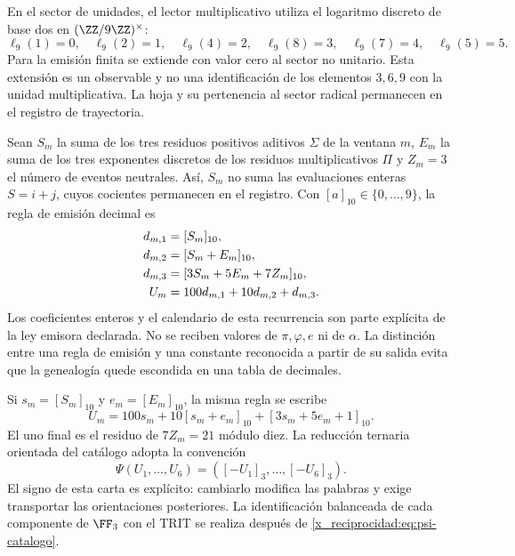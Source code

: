 En el sector de unidades, el lector multiplicativo utiliza el logaritmo discreto de base dos en \((\ZZ/9\ZZ)^\times\):
\[
 \ell_9(1)=0,\quad\ell_9(2)=1,\quad\ell_9(4)=2,\quad
 \ell_9(8)=3,\quad\ell_9(7)=4,\quad\ell_9(5)=5.
\]
Para la emisión finita se extiende con valor cero al sector no unitario. Esta extensión es un observable y no una identificación de los elementos \(3,6,9\) con la unidad multiplicativa. La hoja y su pertenencia al sector radical permanecen en el registro de trayectoria.

Sean \(S_m\) la suma de los tres residuos positivos aditivos \(\Sigma\) de la ventana \(m\), \(E_m\) la suma de los tres exponentes discretos de los residuos multiplicativos \(\Pi\) y \(Z_m=3\) el número de eventos neutrales. Así, \(S_m\) no suma las evaluaciones enteras \(S=i+j\), cuyos cocientes permanecen en el registro. Con \([a]_{10}\in\{0,\ldots,9\}\), la regla de emisión decimal es
\begin{align}
 d_{m,1}&=[S_m]_{10},\notag\\
 d_{m,2}&=[S_m+E_m]_{10},\notag\\
 d_{m,3}&=[3S_m+5E_m+7Z_m]_{10},\notag\\
 U_m&=100d_{m,1}+10d_{m,2}+d_{m,3}.
 \label{x_reciprocidad:eq:emisor-seis}
\end{align}
Los coeficientes enteros y el calendario de esta recurrencia son parte explícita de la ley emisora declarada. No se reciben valores de \(\pi,\varphi,e\) ni de \(\alpha\). La distinción entre una regla de emisión y una constante reconocida a partir de su salida evita que la genealogía quede escondida en una tabla de decimales.

Si \(s_m=[S_m]_{10}\) y \(e_m=[E_m]_{10}\), la misma regla se escribe
\begin{equation}
 U_m=100s_m+10[s_m+e_m]_{10}+[3s_m+5e_m+1]_{10}.
 \label{x_reciprocidad:eq:acoplamiento}
\end{equation}
El uno final es el residuo de \(7Z_m=21\) módulo diez. La reducción ternaria orientada del catálogo adopta la convención
\begin{equation}
 \Psi(U_1,\ldots,U_6)=([-U_1]_3,\ldots,[-U_6]_3).
 \label{x_reciprocidad:eq:psi-catalogo}
\end{equation}
El signo de esta carta es explícito: cambiarlo modifica las palabras y exige transportar las orientaciones posteriores. La identificación balanceada de cada componente de \(\FF_3\) con el TRIT se realiza después de \eqref{x_reciprocidad:eq:psi-catalogo}.

